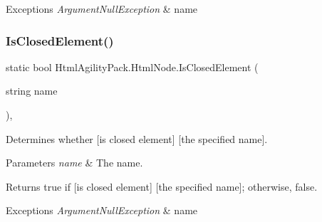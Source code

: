 \begin{DoxyExceptions}{Exceptions}
{\em Argument\+Null\+Exception} & name\\
\hline
\end{DoxyExceptions}
\mbox{\label{class_html_agility_pack_1_1_html_node_a1fcd4753675ee688b1d198c27fffcdac}} 
\subsubsection{\texorpdfstring{Is\+Closed\+Element()}{IsClosedElement()}}
{\footnotesize\ttfamily static bool Html\+Agility\+Pack.\+Html\+Node.\+Is\+Closed\+Element (\begin{DoxyParamCaption}\item[{string}]{name }\end{DoxyParamCaption})\hspace{0.3cm}{\ttfamily [inline]}, {\ttfamily [static]}}



Determines whether \mbox{[}is closed element\mbox{]} \mbox{[}the specified name\mbox{]}. 


\begin{DoxyParams}{Parameters}
{\em name} & The name.\\
\hline
\end{DoxyParams}
\begin{DoxyReturn}{Returns}
{\ttfamily true} if \mbox{[}is closed element\mbox{]} \mbox{[}the specified name\mbox{]}; otherwise, {\ttfamily false}.
\end{DoxyReturn}

\begin{DoxyExceptions}{Exceptions}
{\em Argument\+Null\+Exception} & name\\
\hline
\end{DoxyExceptions}
\mbox{\label{class_html_agility_pack_1_1_html_node_a291043d73de281deda489ca6ef8b3235}} 
